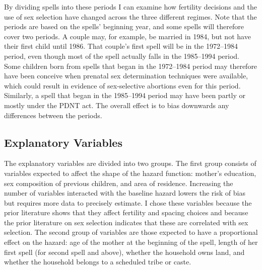\documentclass[12pt,letterpaper]{article}
\begin{document}
By dividing spells into these periods I can examine how fertility
decisions and the use of sex selection have changed across the three different regimes.
Note that the periods are based on the spells' beginning year, and some spells 
will therefore cover two periods.
A couple may, for example, be married in 1984, but not have their first child until 1986.
That couple's first spell will be in the 1972--1984 period, even though most of the 
spell actually falls in the 1985--1994 period.
Some children born from spells that began in the 1972--1984 period may therefore have been
conceive when prenatal sex determination techniques were available, which could result
in evidence of sex-selective abortions even for this period.
Similarly, a spell that began in the 1985--1994 period may have been partly or mostly
under the PDNT act.
The overall effect is to bias downwards any differences between the periods.

\subsection{Explanatory Variables}

The explanatory variables are divided into two groups.
The first group consists of variables expected to affect the shape of the hazard function: 
mother's education, sex composition of previous children, and area of residence.
Increasing the number of variables interacted with the baseline hazard lowers the risk 
of bias but requires more data to precisely estimate.
I chose these variables because the prior literature shows that they affect 
fertility and spacing choices and because the prior literature on sex selection indicates 
that these are correlated with sex selection.
The second group of variables are those expected to have a proportional effect on the 
hazard: age of the mother at the beginning of the spell, length of her first spell 
(for second spell and above), whether the household owns land, and whether the household 
belongs to a scheduled tribe or caste.
\end{document}
